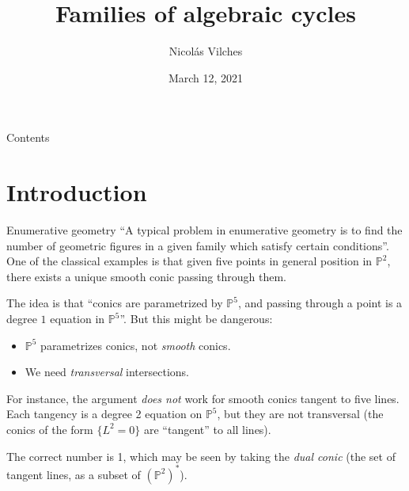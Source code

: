 \documentclass{beamer}
\title{Families of algebraic cycles}
\author{Nicolás Vilches}
\institute{Intersection Theory Seminar \\ Columbia University}
\date{March 12, 2021}
\renewcommand{\P}{\mathbb{P}}
\begin{document}
\begin{frame}
\titlepage
\end{frame}



\begin{frame}{Contents}
\tableofcontents
\end{frame}



\section{Introduction}



\begin{frame}{Enumerative geometry}
``A typical problem in enumerative geometry is to find the number of geometric figures in a given family which satisfy certain conditions''. \pause One of the classical examples is that given five points in general position in $\P^2$, there exists a unique smooth conic passing through them. 
\begin{figure}[H]
\centering 
{}
\end{figure}
\end{frame}



\begin{frame}
The idea is that ``conics are parametrized by $\P^5$, and passing through a point is a degree $1$ equation in $\P^5$''. \pause But this might be dangerous:
\begin{itemize}
\item $\P^5$ parametrizes conics, not \emph{smooth} conics.
\item We need \emph{transversal} intersections.
\end{itemize}

\pause 

For instance, the argument \emph{does not} work for  smooth conics tangent to five lines. Each tangency is a degree 2 equation on $\P^5$, but they are not transversal (the conics of the form $\{L^2=0\}$ are ``tangent'' to all lines). 

The correct number is 1, which may be seen by taking the \emph{dual conic} (the set of tangent lines, as a subset of $(\P^2)^\ast$).
\end{frame}
\end{document}
